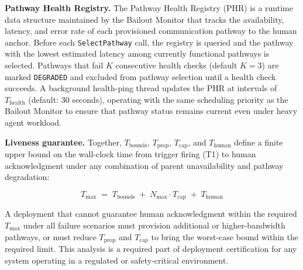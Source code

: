 \bigskip
\noindent\textbf{Pathway Health Registry.} The Pathway Health Registry (PHR) is a runtime data structure maintained by the Bailout Monitor that tracks the availability, latency, and error rate of each provisioned communication pathway to the human anchor. Before each \texttt{SelectPathway} call, the registry is queried and the pathway with the lowest estimated latency among currently functional pathways is selected. Pathways that fail $K$ consecutive health checks (default $K = 3$) are marked \texttt{DEGRADED} and excluded from pathway selection until a health check succeeds. A background health-ping thread updates the PHR at intervals of $T_{\text{health}}$ (default: 30 seconds), operating with the same scheduling priority as the Bailout Monitor to ensure that pathway status remains current even under heavy agent workload.

\bigskip
\noindent\textbf{Liveness guarantee.} Together, $T_{\text{bounds}}$, $T_{\text{prop}}$, $T_{\text{cap}}$, and $T_{\text{human}}$ define a finite upper bound on the wall-clock time from trigger firing (T1) to human acknowledgment under any combination of parent unavailability and pathway degradation:

\begin{equation}
T_{\max} \;=\; T_{\text{bounds}} \;+\; N_{\max} \cdot T_{\text{cap}} \;+\; T_{\text{human}} \tag{T-max}
\end{equation}

A deployment that cannot guarantee human acknowledgment within the required $T_{\max}$ under all failure scenarios must provision additional or higher-bandwidth pathways, or must reduce $T_{\text{prop}}$ and $T_{\text{cap}}$ to bring the worst-case bound within the required limit. This analysis is a required part of deployment certification for any \bxthree{} system operating in a regulated or safety-critical environment.
